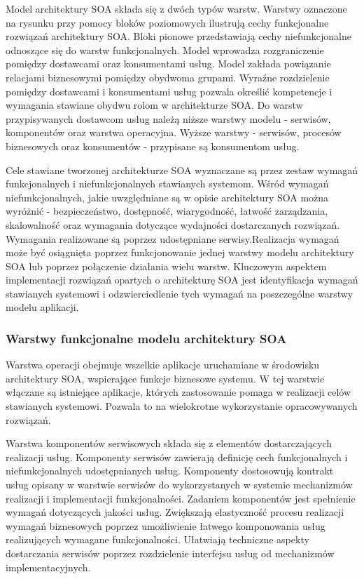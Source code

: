 		Model architektury SOA składa się z dwóch typów warstw. Warstwy oznaczone na rysunku przy pomocy bloków poziomowych ilustrują cechy funkcjonalne rozwiązań architektury SOA. Bloki pionowe przedstawiają cechy niefunkcjonalne odnoszące się do warstw funkcjonalnych. Model wprowadza rozgraniczenie pomiędzy dostawcami oraz konsumentami usług. Model zakłada powiązanie relacjami biznesowymi pomiędzy obydwoma grupami. Wyraźne rozdzielenie pomiędzy dostawcami i konsumentami usług pozwala określić kompetencje i wymagania stawiane obydwu rolom w architekturze SOA. Do warstw przypisywanych dostawcom usług należą niższe warstwy modelu - serwisów, komponentów oraz warstwa operacyjna. Wyższe warstwy - serwisów, procesów biznesowych oraz konsumentów - przypisane są konsumentom usług. 

		Cele stawiane tworzonej architekturze SOA wyznaczane są przez zestaw wymagań funkcjonalnych i niefunkcjonalnych stawianych systemom. Wśród wymagań niefunkcjonalnych, jakie uwzględniane są w opisie architektury SOA można wyróżnić - bezpieczeństwo, dostępność, wiarygodność, łatwość zarządzania, skalowalność oraz wymagania dotyczące wydajności dostarczanych rozwiązań. Wymagania realizowane są poprzez udostępniane serwisy.Realizacja wymagań może być osiągnięta poprzez funkcjonowanie jednej warstwy modelu architektury SOA lub poprzez połączenie działania wielu warstw. Kluczowym aspektem implementacji rozwiązań opartych o architekturę SOA jest identyfikacja wymagań stawianych systemowi i odzwierciedlenie tych wymagań na poszczególne warstwy modelu aplikacji. 

		\subsubsection{Warstwy funkcjonalne modelu architektury SOA}


			Warstwa operacji obejmuje wszelkie aplikacje uruchamiane w środowisku architektury SOA, wspierające funkcje biznesowe systemu. W tej warstwie włączane są istniejące aplikacje, których zastosowanie pomaga w realizacji celów stawianych systemowi. Pozwala to na wielokrotne wykorzystanie opracowywanych rozwiązań\cite{Arsanjani07}. 

			Warstwa komponentów serwisowych składa się z elementów dostarczających realizacji usług. Komponenty serwisów zawierają definicję cech funkcjonalnych i niefunkcjonalnych udostępnianych usług. Komponenty dostosowują kontrakt usług opisany w warstwie serwisów do wykorzystanych w systemie mechanizmów realizacji i implementacji funkcjonalności. Zadaniem komponentów jest spełnienie wymagań dotyczących jakości usług. Zwiększają elastyczność procesu realizacji wymagań biznesowych poprzez umożliwienie łatwego komponowania usług realizujących wymagane funkcjonalności. Ułatwiają techniczne aspekty dostarczania serwisów poprzez rozdzielenie interfejsu usług od mechanizmów implementacyjnych.

